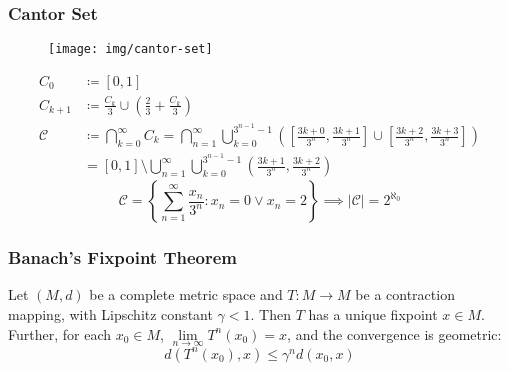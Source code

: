 \documentclass[UTF8,aspectratio=43,11pt,colorlinks,compress,openany]{beamer}%
\begin{document}
\begin{frame}\frametitle{Cantor Set}
	\begin{center}
		\begin{figure}
			\texttt{[image: img/cantor-set]}
		\end{figure}
	\end{center}
	\begin{align*}
	C_0&\coloneqq [0,1]\\
	C_{k+1}&\coloneqq {\frac {C_k}{3}}\cup \left({\frac {2}{3}}+{\frac {C_k}{3}}\right)\\
	\mathcal{C}&\coloneqq \bigcap\limits_{k=0}^\infty C_k=
	\bigcap\limits_{n=1}^\infty\bigcup\limits_{k=0}^{3^{n-1}-1}\left(\left[{\frac{3k+0}{3^{n}}},{\frac{3k+1}{3^{n}}}\right]\cup \left[{\frac {3k+2}{3^{n}}},{\frac {3k+3}{3^{n}}}\right]\right)\\
	&=[0,1]\setminus\bigcup\limits_{n=1}^\infty\bigcup\limits_{k=0}^{3^{n-1}-1}\left({\frac{3k+1}{3^{n}}},{\frac {3k+2}{3^{n}}}\right)
	\end{align*}
	\[\mathcal{C}=\left\{\sum\limits_{n=1}^\infty\frac{x_n}{3^n}: x_n=0\vee x_n=2\right\}\implies |\mathcal{C}|=2^{\aleph_0}\]
\end{frame}

\begin{frame}\frametitle{Banach's Fixpoint Theorem}
	\begin{theorem}
		Let $(M,d)$ be a complete metric space and $T: M\to M$ be a contraction mapping, with Lipschitz constant $\gamma<1$. Then $T$ has a unique fixpoint $x\in M$. Further, for each $x_0\in M$, $\lim\limits_{n\to\infty}T^n(x_0)=x$, and the convergence is geometric:
		\[d(T^n(x_0),x)\leq\gamma^n d(x_0,x)\]
	\end{theorem}
\end{frame}
\end{document}
